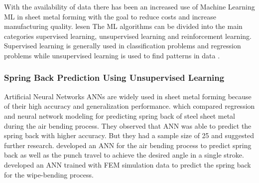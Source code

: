 




With the availability of data there has been an increased use of Machine Learning \ac{ML} in
sheet metal forming with the goal to reduce costs and increase manufacturing quality.
\cite{bock_reviewapplicationmachine_2019} \cite[]{cao_manufacturingadvancedsmart_2019} %
lesen
The ML algorithms can be divided into the main categories supervised learning, unsupervised
learning and reinforcement learning. \cite[]{liu_reinforcementlearningfreeform_2020}
Supervised learning is generally used in classification problems and regression problems while
unsupervised learning is used to find patterns in data \cite[p.
2]{cruz_applicationmachinelearning_2021}.

\subsubsection*{Spring Back Prediction Using Unsupervised Learning}
Artificial Neural Networks \ac{ANN}s are widely used in sheet metal forming because of their high
accuracy and generalization performance. \cite[p. 2]{cruz_applicationmachinelearning_2021}
\cite[]{narayanasamy_comparisonregressionartificial_2012a} which compared regression and neural
network modeling for predicting spring back of steel sheet metal during the air bending process.
They observed that ANN was able to predict the spring back with higher accuracy. But they had a
sample size of 25 and suggested further research.
\cite[]{inamdar_developmentartificialneural_2000} developed an ANN for the air bending process to
predict spring back as well as the punch travel to achieve the desired angle in a single stroke.
\cite[]{kazan_predictionspringbackwipebending_2009} developed an ANN trained with FEM simulation
data to predict the spring back for the wipe-bending process.


